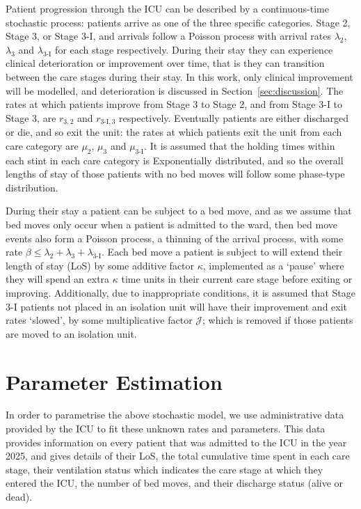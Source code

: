 \documentclass{article}
\begin{document}
Patient progression through the ICU can be described by a continuous-time
stochastic process: patients arrive as one of the three specific categories.
Stage 2, Stage 3, or Stage 3-I, and arrivals follow a Poisson process with
arrival rates $\lambda_2$, $\lambda_3$ and $\lambda_{3\text{-I}}$ for each stage
respectively.
During their stay they can experience clinical deterioration or improvement over
time, that is they can transition between the care stages during their stay.
In this work, only clinical improvement will be modelled, and deterioration is
discussed in Section~\ref{sec:discussion}.
The rates at which patients improve from Stage 3 to Stage 2, and from Stage 3-I
to Stage 3, are $r_{3,2}$ and $r_{3\text{-I},3}$ respectively. 
Eventually patients are either discharged or die, and so exit the unit:
the rates at which patients exit the unit from each care category are $\mu_2$,
$\mu_3$ and $\mu_{3\text{-I}}$.
It is assumed that the holding times within each stint in each care category is
Exponentially distributed, and so the overall lengths of stay of those patients
with no bed moves will follow some phase-type distribution.

During their stay a patient can be subject to a bed move, and as we assume that
bed moves only occur when a patient is admitted to the ward, then bed move
events also form a Poisson process, a thinning of the arrival process, with
some rate $\beta \leq \lambda_2 + \lambda_3 + \lambda_{3\text{-I}}$.
Each bed move a patient is subject to will extend their length of stay (LoS) by
some additive factor $\kappa$, implemented as a `pause' where they will spend an
extra $\kappa$ time units in their current care stage before exiting or
improving.
Additionally, due to inappropriate conditions, it is assumed that Stage 3-I
patients not placed in an isolation unit will have their improvement and exit
rates `slowed', by some multiplicative factor $\mathcal{J}$; which is removed if
those patients are moved to an isolation unit.


\section{Parameter Estimation}\label{sec:param_estimation}
In order to parametrise the above stochastic model, we use administrative data
provided by the ICU to fit these unknown rates and parameters.
This data provides information on every patient that was admitted to the ICU in
the year 2025, and gives details of their LoS, the total cumulative time spent
in each care stage, their ventilation status which indicates the care stage at
which they entered the ICU, the number of bed moves, and their discharge status
(alive or dead).
\end{document}
